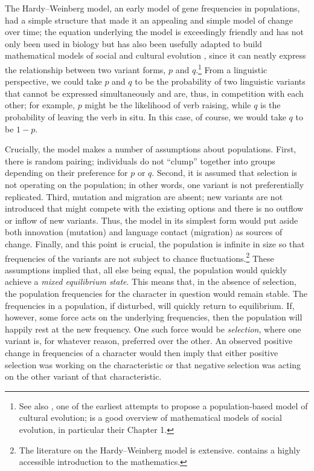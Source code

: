 \documentclass[output=paper]{langsci/langscibook}
\begin{document}
The Hardy--Weinberg model, an early model of gene frequencies in populations,
had a simple structure that made it an appealing and simple model of change
over time; the equation underlying the model is exceedingly friendly and has
not only been used in biology but has also been usefully adapted to build
mathematical models of social and cultural evolution
\citep{boyd-richerson:1985}, since it can neatly express the relationship
between two variant forms, $p$ and $q$.\footnote{See also
    \citet{llcs-feldman:1981}, one of the earliest attempts to propose a
    population-based model of cultural evolution; \citet{mcelreath-boyd:2007}
is a good overview of mathematical models of social evolution, in particular
their Chapter 1.} From a linguistic perspective, we could take $p$ and $q$ to
be the probability of two linguistic variants that cannot be expressed
simultaneously and are, thus, in competition with each other; for example, $p$
might be the likelihood of verb raising, while $q$ is the probability of
leaving the verb in situ.  In this case, of course, we would take $q$ to be $1
- p$.

Crucially, the model makes a number of assumptions about populations.
First, there is random pairing; individuals do not ``clump'' together
into groups depending on their preference for $p$ or $q$. Second, it
is assumed that selection is not operating on the population; in other
words, one variant is not preferentially replicated.  Third, mutation
and migration are absent; new variants are not introduced that might
compete with the existing options and there is no outflow or inflow of
new variants. Thus, the model in its simplest form would put aside
both innovation (mutation) and language contact (migration) as sources
of change.  Finally, and this point is crucial, the population is
infinite in size so that frequencies of the variants are not subject
to chance fluctuations.\footnote{The literature on the Hardy--Weinberg
  model is extensive.  \citet{bergstrom-dugatkin:2012} contains a
  highly accessible introduction to the mathematics.}  These
assumptions implied that, all else being equal, the population would
quickly achieve a \emph{mixed equilibrium state}.  This means that, in
the absence of selection, the population frequencies for the character
in question would remain stable. The frequencies in a population, if
disturbed, will quickly return to equilibrium.  If, however, some
force acts on the underlying frequencies, then the population will
happily rest at the new frequency.  One such force would be
\emph{selection}, where one variant is, for whatever reason, preferred
over the other.  An observed positive change in frequencies of a
character would then imply that either positive selection was working
on the characteristic or that negative selection was acting on the
other variant of that characteristic.
\end{document}

